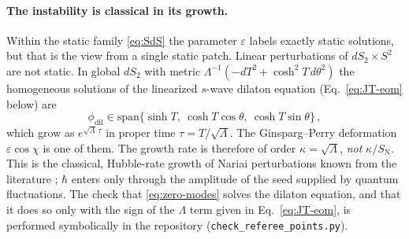 \documentclass[11pt]{article}
\begin{document}
\paragraph{The instability is classical in its growth.} Within the static family \eqref{eq:SdS} the parameter $\varepsilon$ labels exactly static solutions, but that is the view from a single static patch. Linear perturbations of $dS_2\times S^2$ are not static. In global $dS_2$ with metric $\Lambda^{-1}(-dT^2+\cosh^2T\,d\theta^2)$ the homogeneous solutions of the linearized $s$-wave dilaton equation (Eq.~\eqref{eq:JT-eom} below) are
\begin{equation}
\phi_{\mathrm{dil}} \in \mathrm{span}\{\sinh T,\ \cosh T\cos\theta,\ \cosh T\sin\theta\}\,,
\label{eq:zero-modes}
\end{equation}
which grow as $e^{\sqrt{\Lambda}\,\tau}$ in proper time $\tau = T/\sqrt\Lambda$. The Ginsparg--Perry deformation $\varepsilon\cos\chi$ is one of them. The growth rate is therefore of order $\kappa=\sqrt\Lambda$, \emph{not} $\kappa/S_{\mathrm N}$. This is the classical, Hubble-rate growth of Nariai perturbations known from the literature \cite{Bousso1998}; $\hbar$ enters only through the amplitude of the seed supplied by quantum fluctuations. The check that \eqref{eq:zero-modes} solves the dilaton equation, and that it does so only with the sign of the $\Lambda$ term given in Eq.~\eqref{eq:JT-eom}, is performed symbolically in the repository (\texttt{check\_referee\_points.py}).
\end{document}
